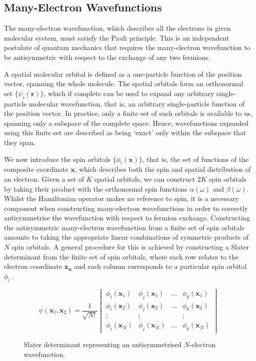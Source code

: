 \subsection{Many-Electron Wavefunctions}%
\label{many-electron-wavefunctions}

The many-electron wavefunction, which describes all the electrons in given molecular system, must satisfy the Pauli principle. This is an independent postulate of quantum mechanics that requires the many-electron wavefunction to be antisymmetric with respect to the exchange of any two fermions.

A spatial molecular orbital is defined as a one-particle function of the position vector, spanning the whole molecule. The spatial orbitals form an orthonormal set $\{\psi_i(\mathbf{r})\}$, which if complete can be used to expand any arbitrary single-particle molecular wavefunction, that is, an arbitrary single-particle function of the position vector. In practice, only a finite set of such orbitals is available to us, spanning only a subspace of the complete space. Hence, wavefunctions expanded using this finite set are described as being `exact' only within the subspace that they span.

We now introduce the spin orbitals $\{\phi_i(\mathbf{x})\}$, that is, the set of functions of the composite coordinate $\mathbf{x}$, which describes both the spin and spatial distribution of an electron. Given a set of $K$ spatial orbitals, we can construct $2K$ spin orbitals by taking their product with the orthonormal spin functions $\alpha(\omega)$ and $\beta(\omega)$. Whilst the Hamiltonian operator makes no reference to spin, it is a necessary component when constructing many-electron wavefunctions in order to correctly antisymmetrise the wavefunction with respect to fermion exchange. Constructing the antisymmetric many-electron wavefunction from a finite set of spin orbitals amounts to taking the appropriate linear combinations of symmetric products of $N$ spin orbitals. A general procedure for this is achieved by constructing a Slater determinant from the finite set of spin orbitals, where each row relates to the electron coordinate $\mathbf{x_n}$ and each column corresponds to a particular spin orbital $\phi_i$ \cite{Atilla1996}. 

\begin{figure}[H]
\centering
\begin{equation*}
\psi(\mathbf{x}_1, \mathbf{x}_2) =
%
\frac{1}{\sqrt{N!}} \begin{vmatrix}
\phi_i (\mathbf{x}_1) & \phi_j (\mathbf{x}_1) & \dots & \phi_k (\mathbf{x}_1) \\
\phi_i (\mathbf{x}_2) & \phi_j (\mathbf{x}_2) & \dots & \phi_k (\mathbf{x}_2) \\
\vdots & \vdots &   & \vdots \\
\phi_i (\mathbf{x}_N) & \phi_j (\mathbf{x}_N) & \dots & \phi_k (\mathbf{x}_N)
\end{vmatrix}
\end{equation*}
\caption{Slater determinant representing an antisymmetrised $N$-electron wavefunction.}
\end{figure}

